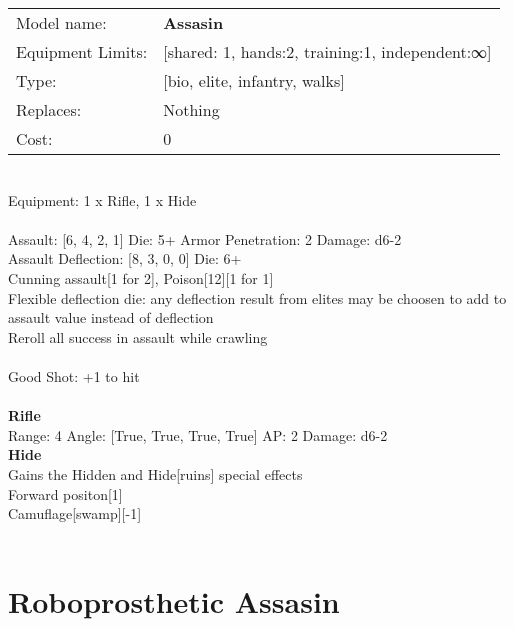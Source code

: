 \noindent
\begin{tabular}{ll}
Model name: &{\bf Assasin } \\
Equipment Limits: &[shared: 1, hands:2, training:1, independent:∞] \\
Type: &[bio, elite, infantry, walks] \\
Replaces: &Nothing \\
Cost: & 0\\
\end{tabular}
\ \\
Equipment: 1 x Rifle, 1 x Hide \\
\ \\
Assault: [6, 4, 2, 1] Die: 5+ Armor Penetration: 2 Damage: d6-2 \\
Assault Deflection: [8, 3, 0, 0] Die: 6+\\
\indent Cunning assault[1 for 2], Poison[12][1 for 1]\\ 
Flexible deflection die: any deflection result from elites may be choosen to add to assault value instead of deflection\\ 
Reroll all success in assault while crawling\\ 
 
\ \\
Good Shot: +1 to hit\\ 

\ \\
{\bf Rifle } \\



Range: 4  Angle: [True, True, True, True] AP: 2 Damage: d6-2 \\




{\bf Hide } \\

Gains the Hidden and Hide[ruins] special effects\\ 
Forward positon[1]\\ 
Camuflage[swamp][-1]\\ 





 
\ \\













\clearpage

\section{ Roboprosthetic Assasin }

